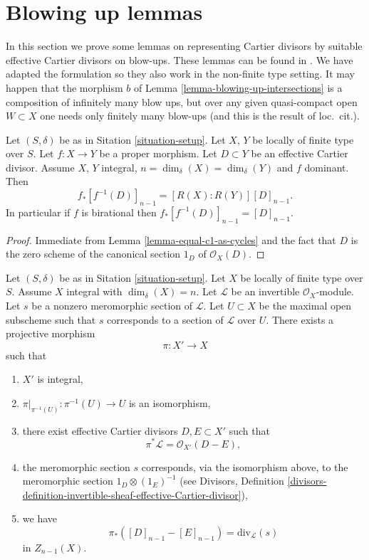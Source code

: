 \section{Blowing up lemmas}
\label{section-blowing-up-lemmas}

\noindent
In this section we prove some lemmas on representing
Cartier divisors by suitable effective Cartier divisors
on blow-ups. These lemmas can be found in \cite[Section 2.4]{F}.
We have adapted the formulation so they also work
in the non-finite type setting. It may happen that the morphism $b$
of Lemma \ref{lemma-blowing-up-intersections} is a composition of
infinitely many blow ups, but over any given quasi-compact open
$W \subset X$ one needs only finitely many blow-ups
(and this is the result of loc.\ cit.).

\begin{lemma}
\label{lemma-push-pull-effective-Cartier}
Let $(S, \delta)$ be as in Sitation \ref{situation-setup}.
Let $X$, $Y$ be locally of finite type over $S$.
Let $f : X \to Y$ be a proper morphism.
Let $D \subset Y$ be an effective Cartier divisor.
Assume $X$, $Y$ integral, $n = \dim_\delta(X) = \dim_\delta(Y)$ and
$f$ dominant. Then
$$
f_*[f^{-1}(D)]_{n - 1} = [R(X) : R(Y)] [D]_{n - 1}.
$$
In particular if $f$ is birational then $f_*[f^{-1}(D)]_{n - 1} = [D]_{n - 1}$.
\end{lemma}

\begin{proof}
Immediate from Lemma \ref{lemma-equal-c1-as-cycles}
and the fact that $D$ is the zero
scheme of the canonical section $1_D$ of $\mathcal{O}_X(D)$.
\end{proof}

\begin{lemma}
\label{lemma-blowing-up-denominators}
Let $(S, \delta)$ be as in Sitation \ref{situation-setup}.
Let $X$ be locally of finite type over $S$.
Assume $X$ integral with $\dim_\delta(X) = n$.
Let $\mathcal{L}$ be an invertible $\mathcal{O}_X$-module.
Let $s$ be a nonzero meromorphic section of $\mathcal{L}$.
Let $U \subset X$ be the maximal open subscheme such that
$s$ corresponds to a section of $\mathcal{L}$ over $U$.
There exists a projective morphism
$$
\pi : X' \longrightarrow X
$$
such that
\begin{enumerate}
\item $X'$ is integral,
\item $\pi|_{\pi^{-1}(U)} : \pi^{-1}(U) \to U$ is an isomorphism,
\item there exist effective Cartier divisors $D, E \subset X'$
such that 
$$
\pi^*\mathcal{L} = \mathcal{O}_{X'}(D - E),
$$
\item the meromorphic section $s$ corresponds, via the isomorphism above,
to the meromorphic section $1_D \otimes (1_E)^{-1}$ (see Divisors,
Definition
\ref{divisors-definition-invertible-sheaf-effective-Cartier-divisor}),
\item we have
$$
\pi_*([D]_{n - 1} - [E]_{n - 1}) = \text{div}_{\mathcal{L}}(s)
$$
in $Z_{n - 1}(X)$.
\end{enumerate}
\end{lemma}

